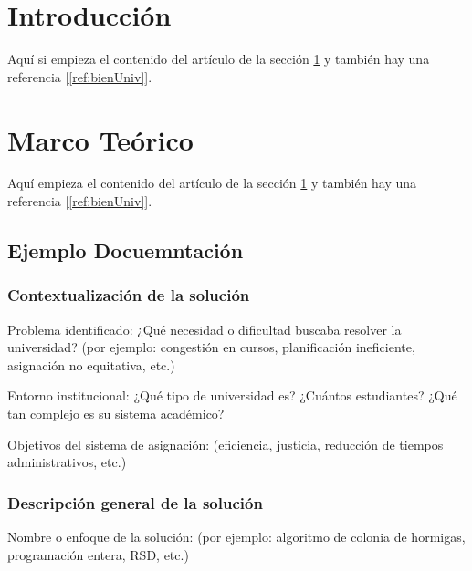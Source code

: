 \documentclass{article}
\begin{document}

\section{Introducción}\label{sec:intr}
Aquí si empieza el contenido del artículo de la sección \ref{sec:intr} y también hay una referencia [\ref{ref:bienUniv}].


\section{Marco Teórico}\label{sec:marc}
Aquí empieza el contenido del artículo de la sección \ref{sec:intr} y también hay una referencia [\ref{ref:bienUniv}].

\subsection{Ejemplo Docuemntación}

\subsubsection{Contextualización de la solución}

Problema identificado: ¿Qué necesidad o dificultad buscaba resolver la universidad? (por ejemplo: congestión en cursos, planificación ineficiente, asignación no equitativa, etc.)

Entorno institucional: ¿Qué tipo de universidad es? ¿Cuántos estudiantes? ¿Qué tan complejo es su sistema académico?

Objetivos del sistema de asignación: (eficiencia, justicia, reducción de tiempos administrativos, etc.)

\subsubsection{Descripción general de la solución}
Nombre o enfoque de la solución: (por ejemplo: algoritmo de colonia de hormigas, programación entera, RSD, etc.)
\end{document}
